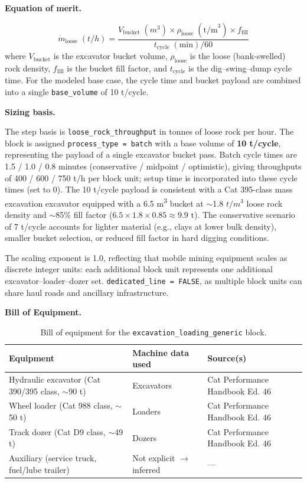 \medskip
\noindent\textbf{Equation of merit.}\quad

\[
	\dot{m}_{\text{loose}}\;(\si{t/h}) = \frac{V_{\text{bucket}}\;(\si{m^3}) \times \rho_{\text{loose}}\;(\text{t/m}^3) \times f_{\text{fill}}}{t_{\text{cycle}}\;(\text{min}) / 60}
\]
where $V_{\text{bucket}}$ is the excavator bucket volume, $\rho_{\text{loose}}$ is the loose (bank-swelled) rock density, $f_{\text{fill}}$ is the bucket fill factor, and $t_{\text{cycle}}$ is the dig--swing--dump cycle time. For the modeled base case, the cycle time and bucket payload are combined into a single \texttt{base\_volume} of 10 t/cycle.

\medskip
\noindent\textbf{Sizing basis.}\quad

The step basis is \texttt{loose\_rock\_throughput} in tonnes of loose rock per hour. The block is assigned \texttt{process\_type = batch} with a base volume of \textbf{10 t/cycle}, representing the payload of a single excavator bucket pass. Batch cycle times are 1.5 / 1.0 / 0.8 minutes (conservative / midpoint / optimistic), giving throughputs of 400 / 600 / 750 t/h per block unit; setup time is incorporated into these cycle times (set to 0). The 10 t/cycle payload is consistent with a Cat 395-class mass excavation excavator equipped with a 6.5 \si{m^3} bucket at $\sim$1.8 $\si{t/m^3}$ loose rock density and $\sim$85\% fill factor ($6.5 \times 1.8 \times 0.85 \approx 9.9$ t). The conservative scenario of 7 t/cycle accounts for lighter material (e.g., clays at lower bulk density), smaller bucket selection, or reduced fill factor in hard digging conditions.

The scaling exponent is 1.0, reflecting that mobile mining equipment scales as discrete integer units: each additional block unit represents one additional excavator--loader--dozer set. \texttt{dedicated\_line = FALSE}, as multiple block units can share haul roads and ancillary infrastructure.

\medskip
\noindent\textbf{Bill of Equipment.}\quad

\begin{table}[h!]
\caption{Bill of equipment for the \texttt{excavation\_loading\_generic} block.}
\centering
\begin{tabular}{>{\raggedright\arraybackslash}p{5.2cm}
				>{\raggedright\arraybackslash}p{4cm}
				>{\raggedright\arraybackslash}p{4.5cm}}
\toprule
\textbf{Equipment} & \textbf{Machine data used} & \textbf{Source(s)} \\
\midrule
Hydraulic excavator (Cat 390/395 class, $\sim$90 t) & Excavators & Cat Performance Handbook Ed. 46 \\
Wheel loader (Cat 988 class, $\sim$50 t) & Loaders & Cat Performance Handbook Ed. 46 \\
Track dozer (Cat D9 class, $\sim$49 t) & Dozers & Cat Performance Handbook Ed. 46 \\
Auxiliary (service truck, fuel/lube trailer) & Not explicit $\rightarrow$ inferred & --- \\
\bottomrule
\end{tabular}
\end{table}

